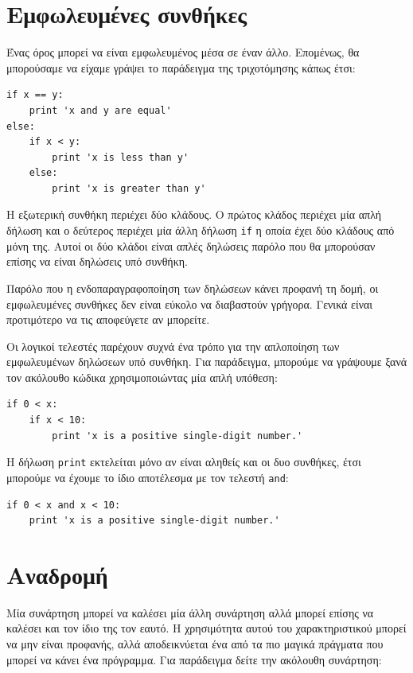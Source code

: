 \documentclass[10pt]{book}
\begin{document}
\section{Εμφωλευμένες συνθήκες}

Ένας όρος μπορεί να είναι εμφωλευμένος μέσα σε έναν άλλο. Επομένως, θα μπορούσαμε να είχαμε γράψει το παράδειγμα της τριχοτόμησης κάπως έτσι:

\begin{verbatim}
if x == y:
    print 'x and y are equal'
else:
    if x < y:
        print 'x is less than y'
    else:
        print 'x is greater than y'
\end{verbatim}
%

Η εξωτερική συνθήκη περιέχει δύο κλάδους. Ο πρώτος κλάδος περιέχει μία απλή δήλωση και ο δεύτερος περιέχει μία άλλη δήλωση {\tt if} η οποία έχει δύο κλάδους από μόνη της. Αυτοί οι δύο κλάδοι είναι απλές δηλώσεις παρόλο που θα μπορούσαν επίσης να είναι δηλώσεις υπό συνθήκη.

Παρόλο που η ενδοπαραγραφοποίηση των δηλώσεων κάνει προφανή τη δομή, οι εμφωλευμένες συνθήκες δεν είναι εύκολο να διαβαστούν γρήγορα. Γενικά είναι προτιμότερο να τις αποφεύγετε αν μπορείτε.

Οι λογικοί τελεστές παρέχουν συχνά ένα τρόπο για την απλοποίηση των εμφωλευμένων δηλώσεων υπό συνθήκη. Για παράδειγμα, μπορούμε να γράψουμε ξανά τον ακόλουθο κώδικα χρησιμοποιώντας μία απλή υπόθεση:

\begin{verbatim}
if 0 < x:
    if x < 10:
        print 'x is a positive single-digit number.'
\end{verbatim}
%

Η δήλωση {\tt print} εκτελείται μόνο αν είναι αληθείς και οι δυο συνθήκες,
έτσι μπορούμε να έχουμε το ίδιο αποτέλεσμα με τον τελεστή {\tt and}:

\begin{verbatim}
if 0 < x and x < 10:
    print 'x is a positive single-digit number.'
\end{verbatim}


\section{Αναδρομή}
\label{recursion}


Μία συνάρτηση μπορεί να καλέσει μία άλλη συνάρτηση αλλά μπορεί επίσης να καλέσει και τον ίδιο της τον εαυτό. Η χρησιμότητα αυτού του χαρακτηριστικού μπορεί να μην είναι προφανής, αλλά αποδεικνύεται ένα από τα πιο μαγικά πράγματα που μπορεί να κάνει ένα πρόγραμμα. Για παράδειγμα δείτε την ακόλουθη συνάρτηση:
\end{document}
